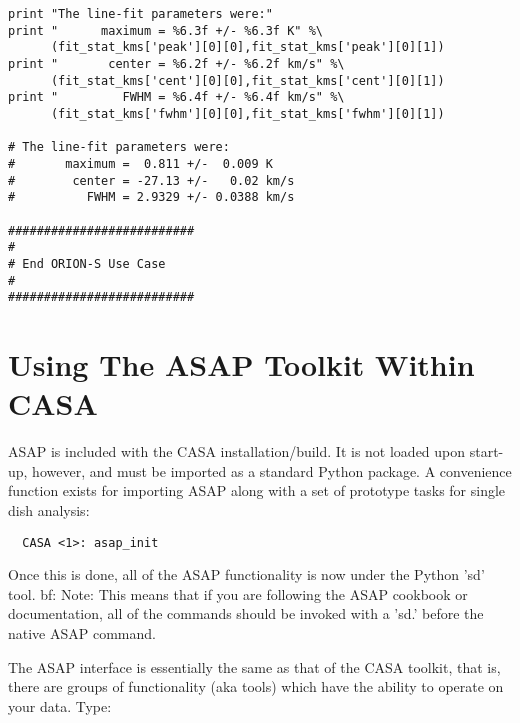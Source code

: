 \begin{verbatim}
print "The line-fit parameters were:"
print "      maximum = %6.3f +/- %6.3f K" %\
      (fit_stat_kms['peak'][0][0],fit_stat_kms['peak'][0][1])
print "       center = %6.2f +/- %6.2f km/s" %\
      (fit_stat_kms['cent'][0][0],fit_stat_kms['cent'][0][1])
print "         FWHM = %6.4f +/- %6.4f km/s" %\
      (fit_stat_kms['fwhm'][0][0],fit_stat_kms['fwhm'][0][1])

# The line-fit parameters were:
#       maximum =  0.811 +/-  0.009 K
#        center = -27.13 +/-   0.02 km/s
#          FWHM = 2.9329 +/- 0.0388 km/s

##########################
#
# End ORION-S Use Case
#
##########################
\end{verbatim}

\section{Using The ASAP Toolkit Within CASA}
\label{section:sd.asap}

ASAP is included with the CASA installation/build. It is not loaded
upon start-up, however, and must be imported as a standard Python
package. A convenience function exists for importing ASAP along with
a set of prototype tasks for single dish analysis:
\small
\begin{verbatim}
  CASA <1>: asap_init
\end{verbatim}
\normalsize
Once this is done, all of the ASAP functionality is now under the
Python 'sd' tool.  {bf: Note: This means that if you are following
the ASAP cookbook or documentation, all of the commands should be 
invoked with a 'sd.' before the native ASAP command.}

The ASAP interface is essentially the same as that
of the CASA toolkit, that is, there are groups of functionality (aka
tools) which have the ability to operate on your data. Type:

